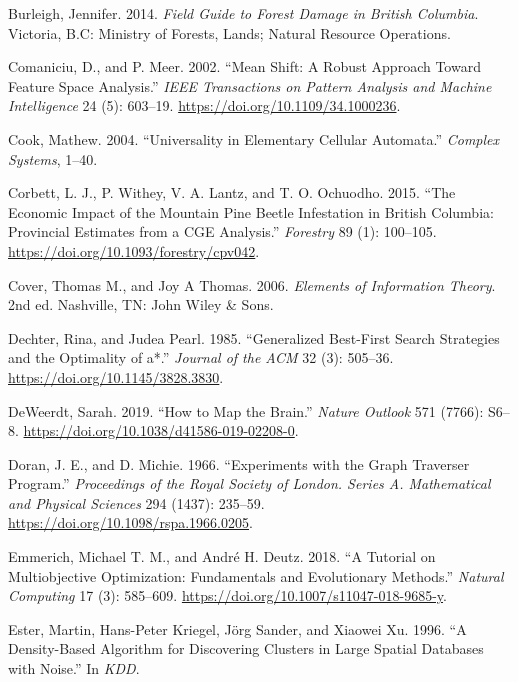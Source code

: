 \documentclass[
  letterpaper,
  DIV=11,
  numbers=noendperiod]{scrreprt}
\newlength{\cslhangindent}
\newenvironment{CSLReferences}[2] %
 {\begin{list}{}{%
  \setlength{\itemindent}{0pt}
  \setlength{\leftmargin}{0pt}
  \setlength{\parsep}{0pt}
  \ifodd #1
   \setlength{\leftmargin}{\cslhangindent}
   \setlength{\itemindent}{-1\cslhangindent}
  \fi
  \setlength{\itemsep}{#2\baselineskip}}}
 {\end{list}}
\begin{document}
\begin{CSLReferences}{1}{0}
Burleigh, Jennifer. 2014. \emph{Field Guide to Forest Damage in British
Columbia}. Victoria, B.C: Ministry of Forests, Lands; Natural Resource
Operations.

Comaniciu, D., and P. Meer. 2002. {``Mean Shift: A Robust Approach
Toward Feature Space Analysis.''} \emph{{IEEE} Transactions on Pattern
Analysis and Machine Intelligence} 24 (5): 603--19.
\url{https://doi.org/10.1109/34.1000236}.

Cook, Mathew. 2004. {``Universality in Elementary Cellular Automata.''}
\emph{Complex Systems}, 1--40.

Corbett, L. J., P. Withey, V. A. Lantz, and T. O. Ochuodho. 2015. {``The
Economic Impact of the Mountain Pine Beetle Infestation in British
Columbia: Provincial Estimates from a {CGE} Analysis.''} \emph{Forestry}
89 (1): 100--105. \url{https://doi.org/10.1093/forestry/cpv042}.

Cover, Thomas M., and Joy A Thomas. 2006. \emph{Elements of Information
Theory}. 2nd ed. Nashville, TN: John Wiley \& Sons.

Dechter, Rina, and Judea Pearl. 1985. {``Generalized Best-First Search
Strategies and the Optimality of a*.''} \emph{Journal of the {ACM}} 32
(3): 505--36. \url{https://doi.org/10.1145/3828.3830}.

DeWeerdt, Sarah. 2019. {``How to Map the Brain.''} \emph{Nature Outlook}
571 (7766): S6--8. \url{https://doi.org/10.1038/d41586-019-02208-0}.

Doran, J. E., and D. Michie. 1966. {``Experiments with the Graph
Traverser Program.''} \emph{Proceedings of the Royal Society of London.
Series A. Mathematical and Physical Sciences} 294 (1437): 235--59.
\url{https://doi.org/10.1098/rspa.1966.0205}.

Emmerich, Michael T. M., and André H. Deutz. 2018. {``A Tutorial on
Multiobjective Optimization: Fundamentals and Evolutionary Methods.''}
\emph{Natural Computing} 17 (3): 585--609.
\url{https://doi.org/10.1007/s11047-018-9685-y}.

Ester, Martin, Hans-Peter Kriegel, Jörg Sander, and Xiaowei Xu. 1996.
{``A Density-Based Algorithm for Discovering Clusters in Large Spatial
Databases with Noise.''} In \emph{KDD}.


\end{CSLReferences}
\end{document}
